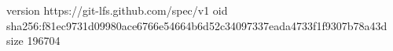 version https://git-lfs.github.com/spec/v1
oid sha256:f81ec9731d09980ace6766e54664b6d52c34097337eada4733f1f9307b78a43d
size 196704
